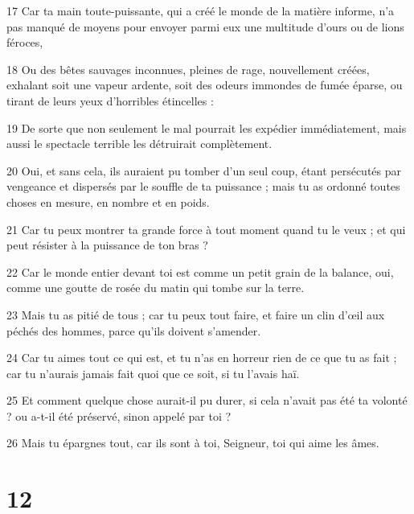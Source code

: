 \par 17 Car ta main toute-puissante, qui a créé le monde de la matière informe, n'a pas manqué de moyens pour envoyer parmi eux une multitude d'ours ou de lions féroces,
\par 18 Ou des bêtes sauvages inconnues, pleines de rage, nouvellement créées, exhalant soit une vapeur ardente, soit des odeurs immondes de fumée éparse, ou tirant de leurs yeux d'horribles étincelles :
\par 19 De sorte que non seulement le mal pourrait les expédier immédiatement, mais aussi le spectacle terrible les détruirait complètement.
\par 20 Oui, et sans cela, ils auraient pu tomber d'un seul coup, étant persécutés par vengeance et dispersés par le souffle de ta puissance ; mais tu as ordonné toutes choses en mesure, en nombre et en poids.
\par 21 Car tu peux montrer ta grande force à tout moment quand tu le veux ; et qui peut résister à la puissance de ton bras ?
\par 22 Car le monde entier devant toi est comme un petit grain de la balance, oui, comme une goutte de rosée du matin qui tombe sur la terre.
\par 23 Mais tu as pitié de tous ; car tu peux tout faire, et faire un clin d'œil aux péchés des hommes, parce qu'ils doivent s'amender.
\par 24 Car tu aimes tout ce qui est, et tu n'as en horreur rien de ce que tu as fait ; car tu n'aurais jamais fait quoi que ce soit, si tu l'avais haï.
\par 25 Et comment quelque chose aurait-il pu durer, si cela n'avait pas été ta volonté ? ou a-t-il été préservé, sinon appelé par toi ?
\par 26 Mais tu épargnes tout, car ils sont à toi, Seigneur, toi qui aime les âmes.

\chapter{12}

